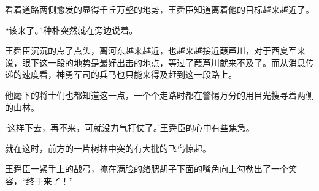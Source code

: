 看着道路两侧愈发的显得千丘万壑的地势，王舜臣知道离着他的目标越来越近了。

“该来了。”种朴突然就在旁边说着。

王舜臣沉沉的点了点头，离河东越来越近，也越来越接近葭芦川，对于西夏军来说，眼下这一段的地势是最好出击的地点，等过了葭芦川就来不及了。而从消息传递的速度看，神勇军司的兵马也只能来得及赶到这一段路上。

他麾下的将士们也都知道这一点，一个个走路时都在警惕万分的用目光搜寻着两侧的山林。

‘这样下去，再不来，可就没力气打仗了。’王舜臣的心中有些焦急。

就在这时，前方的一片树林中突的有大批的飞鸟惊起。

王舜臣一紧手上的战弓，掩在满脸的络腮胡子下面的嘴角向上勾勒出了一个笑容，“终于来了！”


